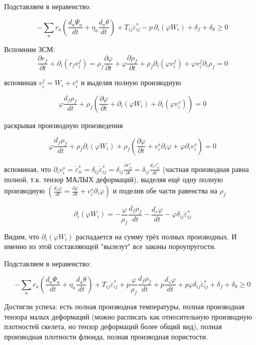 \documentclass[main.tex]{subfiles}
\begin{document}
Подставляем в неравенство:

$$-\sum\limits_a{r_a\left(\frac{d_a\Psi_a}{dt}+\eta_a\frac{d_a\theta}{dt}\right)}+T_{ij}\dot{\varepsilon}_{ij}^s-p\,\partial_i\!\left(\varphi W_i\right)+\delta_f+\delta_\theta\geq 0$$

Вспомним ЗСМ: $$\frac{\partial r_f}{\partial t}+\partial_i\left(r_f v_i^f\right)=\rho_f\frac{\partial\varphi}{\partial t}+\varphi\frac{\partial\rho_f}{\partial t}+\rho_f\partial_i\left(\varphi v_i^f\right)+\varphi v_i^f\partial_i\rho_f=0$$

вспоминая $v_i^f=W_i+v_i^s$ и выделяя полную производную

$$\varphi\frac{d_f\rho_f}{dt}+\rho_f\left(\frac{\partial\varphi}{\partial t}+\partial_i\left(\varphi W_i\right)+\partial_i\left(\varphi v_i^s\right)\right)=0$$

раскрывая производную произведения

$$\varphi\frac{d_f\rho_f}{dt}+\rho_f\partial_i\left(\varphi W_i\right)+\rho_f\left(\frac{\partial\varphi}{\partial t}+v_i^s\partial_i\varphi+\varphi\partial_i v_i^s\right)=0$$

вспоминая, что $\displaystyle{}\partial_i v_i^s=\dot{\varepsilon}_{ii}^s=\delta_{ij}\dot{\varepsilon}_{ij}^s=\delta_{ij}\frac{\partial\varepsilon_{ij}^s}{\partial t}=\delta_{ij}\frac{d_s\varepsilon_{ij}^s}{dt}$ (частная производная равна полной, т.к. тензор МАЛЫХ деформаций), выделяя ещё одну полную производную $\left(\frac{d_s\varphi}{dt}=\frac{\partial\varphi}{\partial t}+v_i^s\partial_i\varphi\right)$ и поделив обе части равенства на $\rho_f$

$$\partial_i\left(\varphi W_i\right)=-\frac{\varphi}{\rho_f}\frac{d_f\rho_f}{dt}-\frac{d_s\varphi}{dt}-\varphi\delta_{ij}\dot{\varepsilon}_{ij}^s$$

Видим, что $\partial_i\left(\varphi W_i\right)$ распадается на сумму трёх полных производных. И именно из этой составляющей "вылезут" все законы пороупругости.

Подставляем в неравенство:

$$-\sum\limits_a{r_a\left(\frac{d_a\Psi_a}{dt}+\eta_a\frac{d_a\theta}{dt}\right)}+T_{ij}\dot{\varepsilon}_{ij}^s+p\frac{\varphi}{\rho_f}\frac{d_f\rho_f}{dt}+p\frac{d_s\varphi}{dt}+p\varphi\delta_{ij}\dot{\varepsilon}_{ij}^s+\delta_f+\delta_\theta\geq 0$$

Достигли успеха: есть полная производная температуры, полная производная тензора малых деформаций (можно расписать как относительную производную плотностей скелета, но тензор  деформаций более общий вид), полная производная плотности флюида, полная производная пористости.
\end{document}
